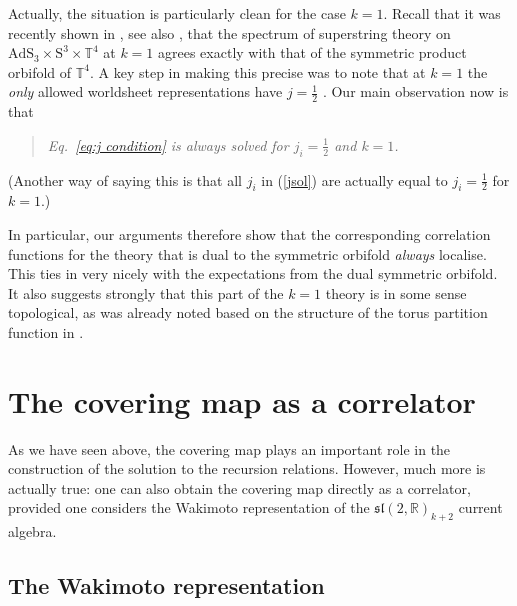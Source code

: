 \documentclass[12pt,a4paper]{article}
\begin{document}
Actually, the situation is particularly clean for the case $k=1$. Recall that it was recently shown in \cite{Eberhardt:2018ouy}, see also \cite{Gaberdiel:2018rqv}, that the spectrum of superstring theory on $\text{AdS}_3 \times \text{S}^3 \times \mathbb{T}^4$ at $k=1$ agrees exactly with that of the symmetric product orbifold of $\mathbb{T}^4$. A key step in making this precise was to note that at $k=1$ the {\it only} allowed worldsheet representations have $j=\tfrac{1}{2}$ \cite{Eberhardt:2018ouy}. Our main observation now is that 
\begin{verse}
{\it Eq.~\eqref{eq:j condition} is always solved for $j_i=\frac{1}{2}$ and $k=1$.}
\end{verse}
(Another way of saying this is that all $j_i$ in (\ref{jsol}) are actually equal to $j_i=\frac{1}{2}$ for $k=1$.)

In particular, our arguments therefore show that the corresponding correlation functions for the theory that is dual to the symmetric orbifold \emph{always} localise. This ties in very nicely with the expectations from the dual symmetric orbifold. It also suggests strongly that this part of the $k=1$ theory is in some sense topological, as was already noted based on the structure of the torus partition function in \cite{Eberhardt:2018ouy}. 



\section{The covering map as a correlator}\label{sec:covering}

As we have seen above, the covering map plays an important role in the construction of the solution to the recursion relations. However, much more is actually true: one can also obtain the covering map directly as a correlator, provided one considers the Wakimoto representation of the $\mathfrak{sl}(2,\mathds{R})_{k+2}$ current algebra.

\subsection{The Wakimoto representation}
\end{document}

